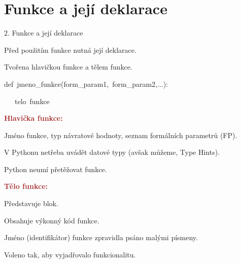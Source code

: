 \documentclass[czech]{beamer}
\newenvironment{lyxcode}
  {\par\begin{list}{}{
    \setlength{\rightmargin}{\leftmargin}
    \setlength{\listparindent}{0pt}%
    \raggedright
    \setlength{\itemsep}{0pt}
    \setlength{\parsep}{0pt}
    \normalfont\ttfamily}%
   \def\{{\char`\{}
   \def\}{\char`\}}
   \def\textasciitilde{\char`\~}
   \item[]}
  {\end{list}}
\begin{document}
\section{Funkce a její deklarace}
\begin{frame}{2. Funkce a její deklarace}

{\scriptsize Před použitím funkce nutná její deklarace.}{\scriptsize\par}

{\scriptsize Tvořena hlavičkou funkce a tělem funkce.}{\scriptsize\par}
\begin{lyxcode}
{\scriptsize def~jmeno\_funkce(form\_param1,~form\_param2,...):~}{\scriptsize\par}

{\scriptsize ~~~telo~funkce}{\scriptsize\par}

{\scriptsize\medskip{}
}{\scriptsize\par}
\end{lyxcode}
{\scriptsize\textbf{\textcolor{brown}{Hlavička funkce:}}}{\scriptsize\par}

{\scriptsize Jméno funkce, typ návratové hodnoty, seznam formálních
parametrů (FP).}{\scriptsize\par}

{\scriptsize V Pythonu netřeba uvádět datové typy (avšak můžeme, Type
Hints).}{\scriptsize\par}

{\scriptsize Python neumí přetěžovat funkce.}{\scriptsize\par}

{\scriptsize\medskip{}
}{\scriptsize\par}

{\scriptsize\textbf{\textcolor{brown}{Tělo funkce:}}}{\scriptsize\par}

{\scriptsize Představuje blok.}{\scriptsize\par}

{\scriptsize Obsahuje výkonný kód funkce.}{\scriptsize\par}

{\scriptsize\medskip{}
}{\scriptsize\par}

{\scriptsize Jméno (identifikátor) funkce zpravidla psáno malými písmeny.}{\scriptsize\par}

{\scriptsize Voleno tak, aby vyjadřovalo funkcionalitu.}{\scriptsize\par}


\end{frame}
\end{document}
